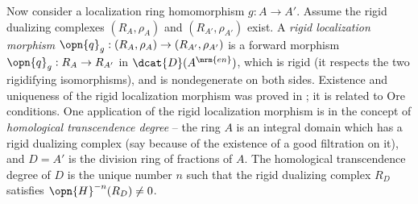 \begin{rem}
Now consider a localization ring homomorphism $g : A \to A'$. Assume the rigid 
dualizing complexes $(R_A, \rho_A)$ and $(R_{A'}, \rho_{A'})$ exist. A {\em 
rigid localization morphism} 
$\opn{q}_g : (R_A, \rho_A) \to (R_{A'}, \rho_{A'})$ 
is a forward morphism $\opn{q}_g : R_A \to R_{A'}$ in 
$\dcat{D}(A^{\mrm{en}})$, which is rigid (it respects 
the two rigidifying isomorphisms), and is nondegenerate on both sides. 
Existence and uniqueness of the rigid localization morphism was proved in 
\cite[Theorem 6.2]{YeZh2.5}; it is related to Ore conditions. One application 
of the rigid localization morphism is in the concept of {\em homological 
transcendence degree} \cite{YeZh1.7} -- the ring $A$ is an 
integral domain which has a rigid dualizing complex (say because of the 
existence of a good filtration on it), and $D = A'$ is the division ring of 
fractions of $A$. The homological transcendence degree of $D$ is the unique 
number $n$ such that the rigid dualizing complex $R_D$ satisfies 
$\opn{H}^{-n}(R_D) \neq 0$. 
\end{rem}

